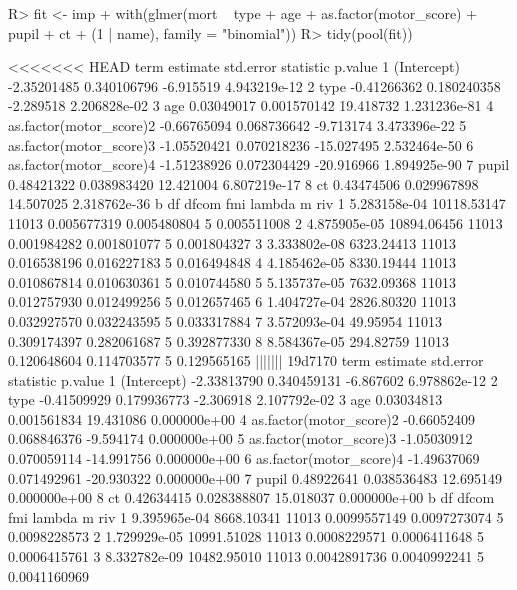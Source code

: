 \documentclass[
]{jss}
\begin{document}
\begin{CodeChunk}
\begin{CodeInput}
R> fit <- imp %
+   with(glmer(mort ~ type + age + as.factor(motor_score) + pupil + ct + (1 | name), family = "binomial")) 
R> tidy(pool(fit))
\end{CodeInput}
\begin{CodeOutput}
<<<<<<< HEAD
                     term    estimate   std.error  statistic      p.value
1             (Intercept) -2.35201485 0.340106796  -6.915519 4.943219e-12
2                    type -0.41266362 0.180240358  -2.289518 2.206828e-02
3                     age  0.03049017 0.001570142  19.418732 1.231236e-81
4 as.factor(motor_score)2 -0.66765094 0.068736642  -9.713174 3.473396e-22
5 as.factor(motor_score)3 -1.05520421 0.070218236 -15.027495 2.532464e-50
6 as.factor(motor_score)4 -1.51238926 0.072304429 -20.916966 1.894925e-90
7                   pupil  0.48421322 0.038983420  12.421004 6.807219e-17
8                      ct  0.43474506 0.029967898  14.507025 2.318762e-36
             b          df dfcom         fmi      lambda m         riv
1 5.283158e-04 10118.53147 11013 0.005677319 0.005480804 5 0.005511008
2 4.875905e-05 10894.06456 11013 0.001984282 0.001801077 5 0.001804327
3 3.333802e-08  6323.24413 11013 0.016538196 0.016227183 5 0.016494848
4 4.185462e-05  8330.19444 11013 0.010867814 0.010630361 5 0.010744580
5 5.135737e-05  7632.09368 11013 0.012757930 0.012499256 5 0.012657465
6 1.404727e-04  2826.80320 11013 0.032927570 0.032243595 5 0.033317884
7 3.572093e-04    49.95954 11013 0.309174397 0.282061687 5 0.392877330
8 8.584367e-05   294.82759 11013 0.120648604 0.114703577 5 0.129565165
||||||| 19d7170
                     term    estimate   std.error  statistic      p.value
1             (Intercept) -2.33813790 0.340459131  -6.867602 6.978862e-12
2                    type -0.41509929 0.179936773  -2.306918 2.107792e-02
3                     age  0.03034813 0.001561834  19.431086 0.000000e+00
4 as.factor(motor_score)2 -0.66052409 0.068846376  -9.594174 0.000000e+00
5 as.factor(motor_score)3 -1.05030912 0.070059114 -14.991756 0.000000e+00
6 as.factor(motor_score)4 -1.49637069 0.071492961 -20.930322 0.000000e+00
7                   pupil  0.48922641 0.038536483  12.695149 0.000000e+00
8                      ct  0.42634415 0.028388807  15.018037 0.000000e+00
             b          df dfcom          fmi       lambda m          riv
1 9.395965e-04  8668.10341 11013 0.0099557149 0.0097273074 5 0.0098228573
2 1.729929e-05 10991.51028 11013 0.0008229571 0.0006411648 5 0.0006415761
3 8.332782e-09 10482.95010 11013 0.0042891736 0.0040992241 5 0.0041160969

\end{CodeOutput}
\end{CodeChunk}
\end{document}
